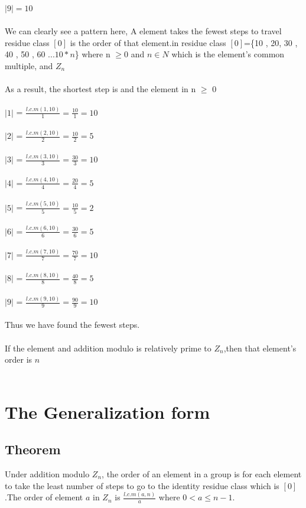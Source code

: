 \documentclass{article}
\begin{document}
$ |9| = 10 $\\\\
We can clearly see a pattern here, A element takes the fewest steps to travel residue class $[0]$ is the order of that element.in residue class $[0]$=\{10 , 20, 30 , 40 , 50 , 60  ...$10*n$\} where n $\geq$0 and $n \in N$ which is the element's common multiple, and $Z_n$\\\\
As a result, the shortest step is and the element in n $\geq$ 0\\\\
$|1|$ = $\frac{l.c.m (1,10)}{1} ={\frac{10}{1}} = 10$\\\\
$|2|$ = $\frac{l.c.m (2,10)}{2} ={\frac{10}{2}} =5$\\\\
$|3|$ = $\frac{l.c.m (3,10)}{3} ={\frac{30}{3}} = 10$\\\\
$|4|$ = $\frac{l.c.m (4,10)}{4} ={\frac{20}{4}} = 5$\\\\
$|5|$ = $\frac{l.c.m (5,10)}{5} ={\frac{10}{5}} = 2$\\\\
$|6|$ = $\frac{l.c.m (6,10)}{6} ={\frac{30}{6}} = 5$\\\\
$|7|$ = $\frac{l.c.m (7,10)}{7} ={\frac{70}{7}} = 10$\\\\
$|8|$ = $\frac{l.c.m (8,10)}{8} ={\frac{40}{8}} = 5$\\\\
$|9|$ = $\frac{l.c.m (9,10)}{9} ={\frac{90}{9}} = 10$\\\\
Thus we have found the fewest steps.\\\\
If the element and addition modulo is relatively prime to $Z_n$,then that element's order is $n$\\\\
\section{The Generalization form}
\subsection{Theorem}
Under addition modulo $Z_n$, the order of an element in a group is for each element to take the least number of steps to go to the identity residue class which is $[0]$.The order of element $a$ in $Z_n$ is  ${\frac{l.c.m(a,n)}{a}}$ where $0<a\le n-1$.\\\
\end{document}
